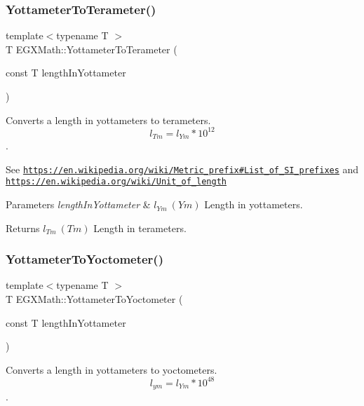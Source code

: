 \subsubsection{\texorpdfstring{Yottameter\+To\+Terameter()}{YottameterToTerameter()}}
{\footnotesize\ttfamily template$<$typename T $>$ \\
T E\+G\+X\+Math\+::\+Yottameter\+To\+Terameter (\begin{DoxyParamCaption}\item[{const T}]{length\+In\+Yottameter }\end{DoxyParamCaption})}



Converts a length in yottameters to terameters. \[ l_{Tm}=l_{Ym} * 10^{12} \]. 

See \href{https://en.wikipedia.org/wiki/Metric_prefix#List_of_SI_prefixes}{\tt https\+://en.\+wikipedia.\+org/wiki/\+Metric\+\_\+prefix\#\+List\+\_\+of\+\_\+\+S\+I\+\_\+prefixes} and \href{https://en.wikipedia.org/wiki/Unit_of_length}{\tt https\+://en.\+wikipedia.\+org/wiki/\+Unit\+\_\+of\+\_\+length} 
\begin{DoxyParams}{Parameters}
{\em length\+In\+Yottameter} & $ l_{Ym}\ (Ym)$ Length in yottameters. \\
\hline
\end{DoxyParams}
\begin{DoxyReturn}{Returns}
$ l_{Tm}\ (Tm)$ Length in terameters. 
\end{DoxyReturn}
\mbox{\label{group___e_g_x_math-_conversions-_length_conversions-_s_i-_yottameter-_s_i_ga946a366f9c912aaa81ab052567f86bc2}} 
\subsubsection{\texorpdfstring{Yottameter\+To\+Yoctometer()}{YottameterToYoctometer()}}
{\footnotesize\ttfamily template$<$typename T $>$ \\
T E\+G\+X\+Math\+::\+Yottameter\+To\+Yoctometer (\begin{DoxyParamCaption}\item[{const T}]{length\+In\+Yottameter }\end{DoxyParamCaption})}



Converts a length in yottameters to yoctometers. \[ l_{ym}=l_{Ym} * 10^{48} \]. 

